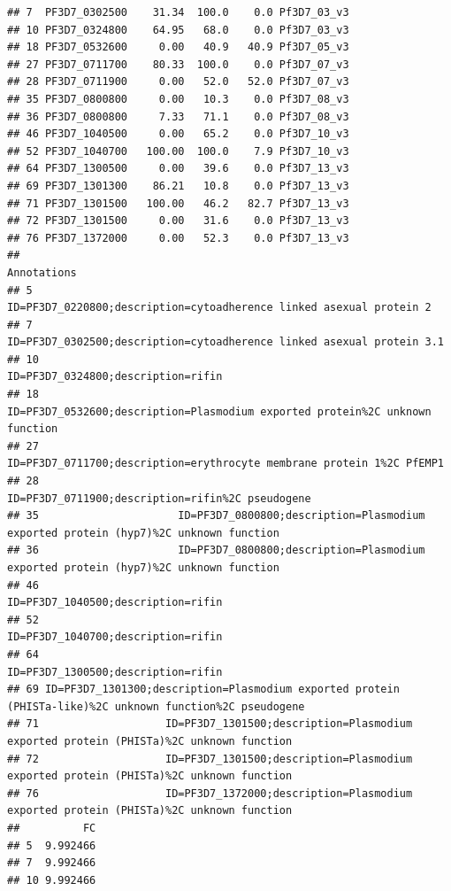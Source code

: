 \documentclass[12pt, a4paper]{article}\usepackage[]{graphicx}\usepackage[]{color}
\makeatletter
\newenvironment{kframe}{%
 \def\at@end@of@kframe{}%
 \ifinner\ifhmode%
  \def\at@end@of@kframe{\end{minipage}}%
  \begin{minipage}{\columnwidth}%
 \fi\fi%
 \def\FrameCommand##1{\hskip\@totalleftmargin \hskip-\fboxsep
 \colorbox{shadecolor}{##1}\hskip-\fboxsep
     \hskip-\linewidth \hskip-\@totalleftmargin \hskip\columnwidth}%
 \MakeFramed {\advance\hsize-\width
   \@totalleftmargin\z@ \linewidth\hsize
   \@setminipage}}%
 {\par\unskip\endMakeFramed%
 \at@end@of@kframe}
\newenvironment{knitrout}{}{} %
\makeatother
\begin{document}
\begin{knitrout}
\begin{kframe}
\begin{verbatim}
## 7  PF3D7_0302500    31.34  100.0    0.0 Pf3D7_03_v3
## 10 PF3D7_0324800    64.95   68.0    0.0 Pf3D7_03_v3
## 18 PF3D7_0532600     0.00   40.9   40.9 Pf3D7_05_v3
## 27 PF3D7_0711700    80.33  100.0    0.0 Pf3D7_07_v3
## 28 PF3D7_0711900     0.00   52.0   52.0 Pf3D7_07_v3
## 35 PF3D7_0800800     0.00   10.3    0.0 Pf3D7_08_v3
## 36 PF3D7_0800800     7.33   71.1    0.0 Pf3D7_08_v3
## 46 PF3D7_1040500     0.00   65.2    0.0 Pf3D7_10_v3
## 52 PF3D7_1040700   100.00  100.0    7.9 Pf3D7_10_v3
## 64 PF3D7_1300500     0.00   39.6    0.0 Pf3D7_13_v3
## 69 PF3D7_1301300    86.21   10.8    0.0 Pf3D7_13_v3
## 71 PF3D7_1301500   100.00   46.2   82.7 Pf3D7_13_v3
## 72 PF3D7_1301500     0.00   31.6    0.0 Pf3D7_13_v3
## 76 PF3D7_1372000     0.00   52.3    0.0 Pf3D7_13_v3
##                                                                                                 Annotations
## 5                                       ID=PF3D7_0220800;description=cytoadherence linked asexual protein 2
## 7                                     ID=PF3D7_0302500;description=cytoadherence linked asexual protein 3.1
## 10                                                                       ID=PF3D7_0324800;description=rifin
## 18                             ID=PF3D7_0532600;description=Plasmodium exported protein%2C unknown function
## 27                                    ID=PF3D7_0711700;description=erythrocyte membrane protein 1%2C PfEMP1
## 28                                                         ID=PF3D7_0711900;description=rifin%2C pseudogene
## 35                      ID=PF3D7_0800800;description=Plasmodium exported protein (hyp7)%2C unknown function
## 36                      ID=PF3D7_0800800;description=Plasmodium exported protein (hyp7)%2C unknown function
## 46                                                                       ID=PF3D7_1040500;description=rifin
## 52                                                                       ID=PF3D7_1040700;description=rifin
## 64                                                                       ID=PF3D7_1300500;description=rifin
## 69 ID=PF3D7_1301300;description=Plasmodium exported protein (PHISTa-like)%2C unknown function%2C pseudogene
## 71                    ID=PF3D7_1301500;description=Plasmodium exported protein (PHISTa)%2C unknown function
## 72                    ID=PF3D7_1301500;description=Plasmodium exported protein (PHISTa)%2C unknown function
## 76                    ID=PF3D7_1372000;description=Plasmodium exported protein (PHISTa)%2C unknown function
##          FC
## 5  9.992466
## 7  9.992466
## 10 9.992466

\end{verbatim}
\end{kframe}
\end{knitrout}
\end{document}
